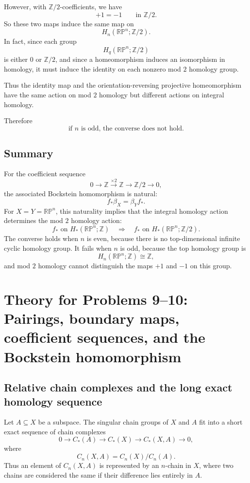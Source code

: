\documentclass[12pt,a4paper]{article}
\theoremstyle{notespace}
\begin{document}
However, with \(\mathbb Z/2\)-coefficients, we have
\[
+1=-1
\qquad
\text{in }
\mathbb Z/2.
\]
So these two maps induce the same map on
\[
H_n(\mathbb{RP}^n;\mathbb Z/2).
\]
In fact, since each group
\[
H_q(\mathbb{RP}^n;\mathbb Z/2)
\]
is either \(0\) or \(\mathbb Z/2\), and since a homeomorphism induces an isomorphism in homology, it must induce the identity on each nonzero mod \(2\) homology group.

Thus the identity map and the orientation-reversing projective homeomorphism have the same action on mod \(2\) homology but different actions on integral homology.

Therefore
\[
\boxed{
	\text{if }n\text{ is odd, the converse does not hold.}
}
\]

\subsection*{Summary}

For the coefficient sequence
\[
0\longrightarrow \mathbb Z
\xrightarrow{\times 2}
\mathbb Z
\longrightarrow
\mathbb Z/2
\longrightarrow 0,
\]
the associated Bockstein homomorphism is natural:
\[
\boxed{
	f_*\beta_X=\beta_Y f_*.
}
\]
For \(X=Y=\mathbb{RP}^n\), this naturality implies that the integral homology action determines the mod \(2\) homology action:
\[
\boxed{
	f_* \text{ on } H_*(\mathbb{RP}^n;\mathbb Z)
	\quad\Longrightarrow\quad
	f_* \text{ on } H_*(\mathbb{RP}^n;\mathbb Z/2).
}
\]
The converse holds when \(n\) is even, because there is no top-dimensional infinite cyclic homology group. It fails when \(n\) is odd, because the top homology group is
\[
H_n(\mathbb{RP}^n;\mathbb Z)\cong \mathbb Z,
\]
and mod \(2\) homology cannot distinguish the maps \(+1\) and \(-1\) on this group.

\section{Theory for Problems 9--10: Pairings, boundary maps, coefficient sequences, and the Bockstein homomorphism}

\subsection{Relative chain complexes and the long exact homology sequence}

Let \(A\subseteq X\) be a subspace. The singular chain groups of \(X\) and \(A\) fit into a short exact sequence of chain complexes
\[
0
\longrightarrow
C_*(A)
\longrightarrow
C_*(X)
\longrightarrow
C_*(X,A)
\longrightarrow
0,
\]
where
\[
C_n(X,A)=C_n(X)/C_n(A).
\]
Thus an element of \(C_n(X,A)\) is represented by an \(n\)-chain in \(X\), where two chains are considered the same if their difference lies entirely in \(A\).
\end{document}
